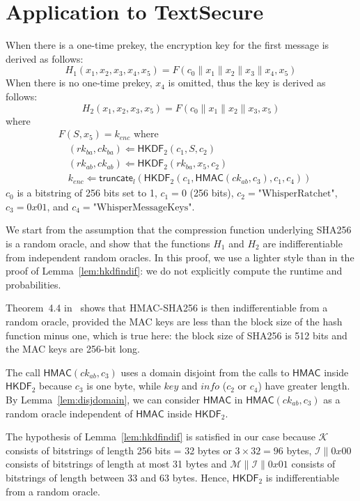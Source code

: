 \documentclass[compsoc, conference, letterpaper, 10pt, times]{IEEEtran}
\newcommand{\HMAC}{\mathsf{HMAC}}
\newcommand{\HKDF}{\mathsf{HKDF}}
\newcommand{\e}{\mathit{enc}}
\newcommand{\rk}{\mathit{rk}}
\newcommand{\ck}{\mathit{ck}}
\newcommand{\key}{\mathit{key}}
\newcommand{\info}{\mathit{info}}
\newcommand{\Skey}{\mathcal{K}}
\newcommand{\Sinfo}{\mathcal{I}}
\newcommand{\Smac}{\mathcal{M}}
\newcommand{\truncate}{\mathsf{truncate}}
\begin{document}
\section{Application to TextSecure}

When there is a one-time prekey, the encryption key for 
the first message is derived as follows:
\[H_1(x_1, x_2, x_3, x_4, x_5) = F(c_0 \| x_1 \| x_2 \| x_3 \| x_4, x_5)\]
When there is no one-time prekey, $x_4$ is omitted, thus the key
is derived as follows:
\[H_2(x_1, x_2, x_3, x_5) = F(c_0 \| x_1 \| x_2 \| x_3, x_5)\]
where
\begin{align*}
&F(S, x_5) = k_{\e}\text{ where}\\
&\quad  (\rk_{ba}, \ck_{ba}) \Leftarrow \HKDF_2(c_1, S, c_2)\\
&\quad  (\rk_{ab}, \ck_{ab}) \Leftarrow \HKDF_2(\rk_{ba}, x_5, c_2)\\
&\quad  k_{\e} \Leftarrow \truncate_l(\HKDF_2(c_1, \HMAC(\ck_{ab}, c_3), c_1, c_4))
\end{align*}
$c_0$ is a bitstring of 256 bits set to 1,
$c_1 = 0$ (256 bits), $c_2 = \text{"WhisperRatchet"}$,
$c_3 = 0x01$, and $c_4 = \text{"WhisperMessageKeys"}$.

We start from the assumption that the compression function underlying
SHA256 is a random oracle, and show that the functions $H_1$ and $H_2$
are indifferentiable from independent random oracles. In this proof,
we use a lighter style than in the proof of Lemma~\ref{lem:hkdfindif}:
we do not explicitly compute the runtime and probabilities.


Theorem~4.4 in~\cite{Dodis12} shows that HMAC-SHA256 is then indifferentiable from a random oracle, provided the MAC keys are less than the block size of the hash function minus one, which is true here: the block size of SHA256 is 512 bits and the MAC keys are 256-bit long.

The call $\HMAC(\ck_{ab}, c_3)$ uses a domain disjoint from the 
calls to $\HMAC$ inside $\HKDF_2$ because $c_3$ is one byte, while
$\key$ and $\info$ ($c_2$ or $c_4$) have greater length.
By Lemma~\ref{lem:disjdomain}, we can consider $\HMAC$ in $\HMAC(\ck_{ab}, c_3)$
as a random oracle independent of $\HMAC$ inside $\HKDF_2$. 

The hypothesis of Lemma~\ref{lem:hkdfindif} is satisfied in our case
because $\Skey$ consists of bitstrings of length 256 bits = 32 bytes or $3 \times 32 = 96$ bytes,
$\Sinfo \| 0x00$ consists of bitstrings of length at most 31 bytes
and $\Smac \| \Sinfo \| 0x01$ consists of bitstrings of length between 33 and 63 bytes. Hence, $\HKDF_2$ is indifferentiable from a random oracle.
\end{document}
